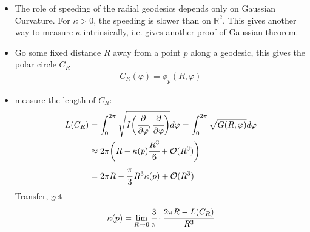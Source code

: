 \documentclass[10pt]{article}
\begin{document}
            \begin{remark}
                \begin{itemize}
                    \item The role of speeding of the radial geodesics depends only on Gaussian Curvature. For $\kappa>0$, the speeding is slower than on $\mathbb{R}^2$. This gives another way to measure $\kappa$ intrinsically, i.e. gives another proof of Gaussian theorem.
                    \item Go some fixed distance $R$ away from a point $p$ along a geodesic, this gives the polar circle $C_R$
                    \begin{equation*}
                        \begin{aligned}
                            C_R(\varphi) = \phi_p(R, \varphi)
                        \end{aligned}
                    \end{equation*}
                    \item measure the length of $C_R$:
                    \begin{equation*}
                        \begin{aligned}
                            L(C_R) &= \int_0^{2\pi}\sqrt{I\bigg( \cfrac{\partial}{\partial\varphi}, \cfrac{\partial}{\partial\varphi} \bigg)}d\varphi = \int_0^{2\pi}\sqrt{G(R,\varphi)}d\varphi \\
                            &\approx 2\pi\bigg( R - \kappa(p)\cfrac{R^3}{6} + \mathcal{O}(R^3) \bigg) \\
                            &= 2\pi R - \cfrac{\pi}{3}\thinspace R^3\kappa(p) + \mathcal{O}(R^3)
                        \end{aligned}
                    \end{equation*}
                    Transfer, get
                    \begin{equation*}
                        \begin{aligned}
                            \kappa(p) = \lim\limits_{R\rightarrow 0}\cfrac{3}{\pi}\cdot\cfrac{2\pi R - L(C_R)}{R^3}
                        \end{aligned}
                    \end{equation*}
                \end{itemize}
            \end{remark}
            
\end{document}
